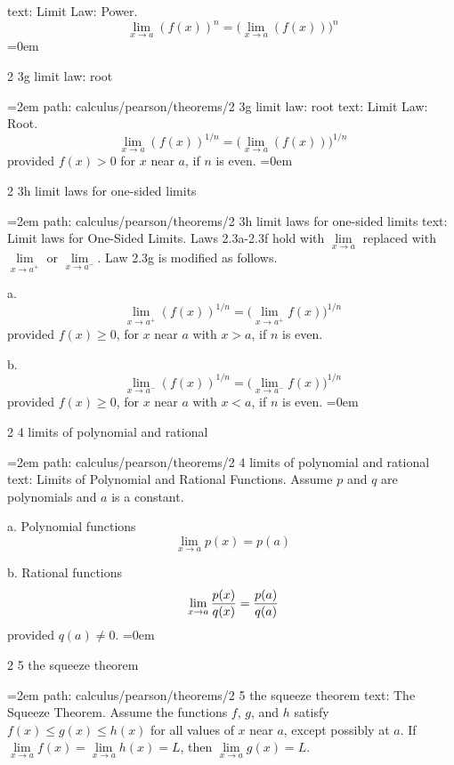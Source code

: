 \smallskip
text:  Limit Law: Power. $$\ \lim_{x \to a}{ (f(x))^n } = \big( \lim_{x \to a}{ (f(x)) } \big)^n $$
\smallskip
\leftskip=0em
\par\endgroup
\bigskip
{}
2 3g limit law: root
\smallskip
\par\begingroup
\leftskip=2em
path: calculus/pearson/theorems/2 3g limit law: root
\smallskip
text:  Limit Law: Root. $$\ \lim_{x \to a}{ (f(x))^{1/n} } = \big( \lim_{x \to a}{ (f(x)) } \big)^{1/n} $$  provided $f(x) > 0$ for $x$ near $a$, if $n$ is even.
\smallskip
\leftskip=0em
\par\endgroup
\bigskip
{}
2 3h limit laws for one-sided limits
\smallskip
\par\begingroup
\leftskip=2em
path: calculus/pearson/theorems/2 3h limit laws for one-sided limits
\smallskip
text:  Limit laws for One-Sided Limits. Laws 2.3a-2.3f hold with $\lim\limits_{x \to a}$ replaced with $\lim\limits_{x \to a^+}$ or $\lim\limits_{x \to a^-}$. Law 2.3g is modified as follows.  \par a.  $$\ \lim_{x \to a^+}(f(x))^{1/n} = \bigg( \lim_{x \to a^+} f(x) \bigg)^{1/n} $$  provided $f(x) \ge 0$, for $x$ near $a$ with $x > a$, if $n$ is even.  \par b.  $$\ \lim_{x \to a^-}(f(x))^{1/n} = \bigg( \lim_{x \to a^-} f(x) \bigg)^{1/n} $$  provided $f(x) \ge 0$, for $x$ near $a$ with $x < a$, if $n$ is even. 
\smallskip
\leftskip=0em
\par\endgroup
\bigskip
{}
2 4 limits of polynomial and rational
\smallskip
\par\begingroup
\leftskip=2em
path: calculus/pearson/theorems/2 4 limits of polynomial and rational
\smallskip
text:  Limits of Polynomial and Rational Functions. Assume $p$ and $q$ are polynomials and $a$ is a constant.  \par a. Polynomial functions $$\ \lim_{x \to a} p(x) = p(a) $$   \par b. Rational functions  $$\ \lim_{x \to a} {p(x) \over q(x)} = {p(a) \over q(a)} $$  provided $q(a) \ne 0$.
\smallskip
\leftskip=0em
\par\endgroup
\bigskip
{}
2 5 the squeeze theorem
\smallskip
\par\begingroup
\leftskip=2em
path: calculus/pearson/theorems/2 5 the squeeze theorem
\smallskip
text:  The Squeeze Theorem. Assume the functions $f$, $g$, and $h$ satisfy $f(x) \le g(x) \le h(x)$ for all values of $x$ near $a$, except possibly at $a$. If $\lim\limits_{x \to a} f(x) = \lim\limits_{x \to a} h(x) = L$, then $\lim\limits_{x \to a} g(x) = L$.

